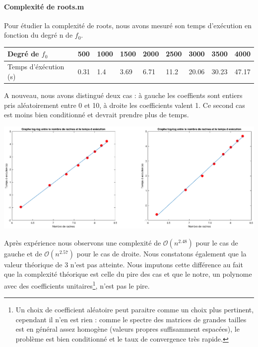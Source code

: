 \documentclass[11pt]{article}
\begin{document}
\paragraph{Complexité de roots.m}
    Pour étudier la complexité de roots, nous avons mesuré son temps d'exécution en fonction du degré n de $f_0$.

    \begin{center}
    \begin{tabular}{|l|l|l|l|l|l|l|l|l|}
    \hline
        Degré de $f_0$  & 500 & 1000 & 1500 & 2000 & 2500 & 3000 & 3500 & 4000 \\
    \hline
       Temps d'éxécution (s) & 0.31 & 1.4   & 3.69 &   6.71  & 11.2  & 20.06  & 30.23 &  47.17\\
    \hline
    \end{tabular}
    \end{center}

    A nouveau, nous avons distingué deux cas : à gauche les coeffients sont entiers pris aléatoirement
    entre 0 et 10, à droite les coefficients valent 1. Ce second cas est moins bien conditionné et devrait prendre plus de temps.

    \begin{center}
      \includegraphics[width=15cm]{image/perfRootm}
    \end{center}

    Après expérience nous observons une complexité de $\mathcal{O}(n^{2.48})$ pour le cas de gauche et de $\mathcal{O}(n^{2.57})$ pour le cas de droite.
    Nous constatons également que la valeur théorique de 3 n'est pas atteinte. Nous imputons cette différence au fait que la complexité théorique est celle du pire des cas et que le notre, un polynome avec des coefficients unitaires\footnote{Un choix de coefficient aléatoire peut paraitre comme un choix plus pertinent, cependant il n'en est rien : comme le spectre des matrices de grandes tailles est en général assez homogène (valeurs propres suffisamment espacées), le problème est bien conditionné et le taux de convergence très rapide.}, n'est pas le pire.
\end{document}
